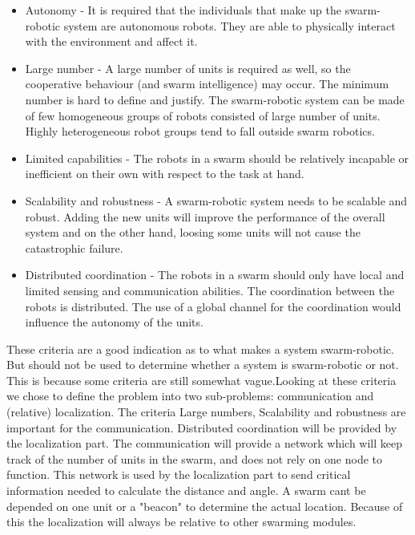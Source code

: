 \documentclass[10pt,a4paper]{article}
\begin{document}
\begin{itemize}
	\item Autonomy - It is required that the individuals that make up 	the swarm-robotic system are autonomous robots. They are able to 		physically 		interact with the environment and affect it\cite{swarmintelligence}.
	\item Large number - A large number of units is required
	as well, so the cooperative behaviour (and
	swarm intelligence) may occur. The minimum number
	is hard to define and justify. The swarm-robotic
	system can be made of few homogeneous groups of
	robots consisted of large number of units. Highly heterogeneous
	robot groups tend to fall outside swarm
	robotics\cite{swarmintelligence}.
	\item Limited capabilities - The robots in a swarm
	should be relatively incapable or inefficient on their
	own with respect to the task at hand\cite{swarmintelligence}.
	\item Scalability and robustness - A swarm-robotic
	system needs to be scalable and robust. Adding the
	new units will improve the performance of the overall
	system and on the other hand, loosing some units will
	not cause the catastrophic failure\cite{swarmintelligence}.
	\item Distributed coordination - The robots in a swarm
	should only have local and limited sensing and communication
	abilities. The coordination between the
	robots is distributed. The use of a global channel for
	the coordination would influence the autonomy of the
	units\cite{swarmintelligence}.
\end{itemize}

These criteria are a good indication as to what makes a system swarm-robotic. But should not be used to determine whether a system is swarm-robotic or not. This is because some criteria are still somewhat vague\cite{swarmintelligence}.Looking at these criteria we chose to define the problem into two sub-problems: communication and (relative) localization.
The criteria Large numbers, Scalability and robustness are important for the communication. Distributed coordination will be provided by the localization part. The communication will provide a network which will keep track of the number of units in the swarm, and does not rely on one node to function. This network is used by the localization part to send critical information needed to calculate the distance and angle. A swarm cant be depended on one unit or a "beacon" to determine the actual location. Because of this the localization will always be relative to other swarming modules.
\end{document}
